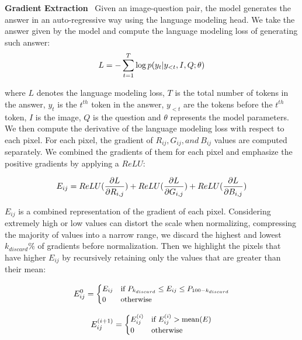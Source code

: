 \textbf{Gradient Extraction}~
Given an image-question pair, the model generates the answer in an auto-regressive way using the language modeling head. We take the answer given by the model and compute the language modeling loss of generating such answer: 
\begin{equation}
\small
L = -\sum_{t=1}^{T} \log p(y_t | y_{<t}, I, Q; \theta)
\end{equation}

where $L$ denotes the language modeling loss, $T$ is the total number of tokens in the answer, $y_t$ is the $t^{th}$ token in the answer, $y_{<t}$ are the tokens before the $t^{th}$ token, $I$ is the image, $Q$ is the question and $\theta$ represents the model parameters. 
We then compute the derivative of the language modeling loss with respect to each pixel. For each pixel, the gradient of $R_{ij}, G_{ij}, and~B_{ij}$ values are computed separately.
We combined the gradients of them for each pixel and emphasize the positive gradients by applying a $ReLU$:

\begin{equation}
\small
E_{ij} = ReLU(\frac{\partial L}{\partial R_{i,j}}) + ReLU(\frac{\partial L}{\partial G_{i,j}}) + ReLU(\frac{\partial L}{\partial B_{i,j}})
\end{equation}

$E_{ij}$ is a combined representation of the gradient of each pixel.
Considering extremely high or low values can distort the scale when normalizing, compressing the majority of values into a narrow range, we discard the highest and lowest $k_{discard}\%$ of gradients before normalization. 
Then we highlight the pixels that have higher $E_{ij}$  by recursively retaining only the values that are greater than their mean:
    
\begin{minipage}{.5\linewidth}
\begin{equation}
\small
\label{formula3}
E^0_{ij} = 
\begin{cases}
E_{ij} & \text{if } P_{k_{discard}} \leq E_{ij} \leq P_{100-k_{discard}} \\
0 & \text{otherwise}
\end{cases}
\end{equation}
\end{minipage}%
\begin{minipage}{.5\linewidth}
\begin{equation}
\small
\label{formula4}
E^{(i+1)}_{ij} = 
\begin{cases}
E^{(i)}_{ij} & \text{if } E^{(i)}_{ij} > \text{mean}(E) \\
0 & \text{otherwise}
\end{cases}
\end{equation}
\end{minipage}



